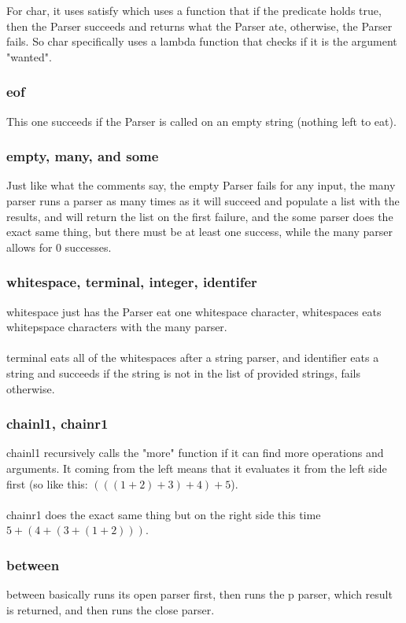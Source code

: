\documentclass[12pt]{article}
\begin{document}
For char, it uses satisfy which uses a function that if the predicate holds true, then the Parser succeeds and returns what the Parser ate, otherwise, the Parser fails. So char specifically uses a lambda function that checks if it is the argument "wanted".

\subsubsection{eof}

This one succeeds if the Parser is called on an empty string (nothing left to eat).

\subsubsection{empty, many, and some}

Just like what the comments say, the empty Parser fails for any input, the many parser runs a parser as many times as it will succeed and populate a list with the results, and will return the list on the first failure, and the some parser does the exact same thing, but there must be at least one success, while the many parser allows for 0 successes.

\subsubsection{whitespace, terminal, integer, identifer}
whitespace just has the Parser eat one whitespace character, whitespaces eats whitepspace characters with the many parser.\\
\\
terminal eats all of the whitespaces after a string parser, and identifier eats a string and succeeds if the string is not in the list of provided strings, fails otherwise.

\subsubsection{chainl1, chainr1}
chainl1 recursively calls the "more" function if it can find more operations and arguments. It coming from the left means that it evaluates it from the left side first (so like this: $(((1+2)+3)+4)+5$).\\
\\
chainr1 does the exact same thing but on the right side this time $5+(4+(3+(1+2)))$.

\subsubsection{between}
between basically runs its open parser first, then runs the p parser, which result is returned, and then runs the close parser.
\end{document}
